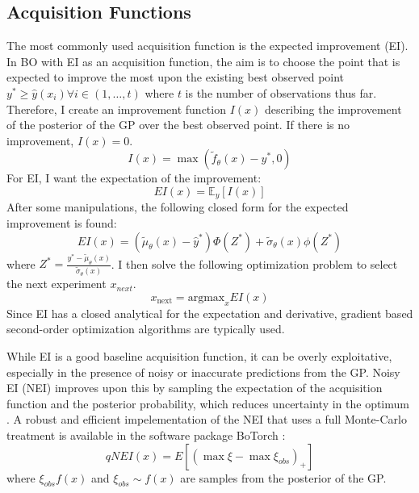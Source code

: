 \subsection{Acquisition Functions}

The most commonly used acquisition function is the expected improvement (EI). In BO with EI as an acquisition function, the aim is to choose the point that is expected to improve the most upon the existing best observed point $y^* \geq \hat y(x_i) \forall i \in (1, \dots, t)$  where  $t$ is the number of observations thus far. Therefore, I create an improvement function $I(x)$ describing the improvement of the posterior of the GP over the best observed point. If there is no improvement, $I(x)=0$.
\begin{equation}
    I(x) = \max(\tilde f_{\theta}(x) -y^*, 0)
\end{equation}
For EI, I want the expectation of the improvement:
\begin{equation}
    EI(x) = \mathbb E_{y}[I(x)]
\end{equation}
After some manipulations, the following closed form for the expected improvement is found:
\begin{equation}
    EI(x) =(\tilde \mu_{\theta}(x)-\hat y^*)\Phi(Z^*) + \tilde \sigma_{\theta}(x) \phi(Z^*)
\end{equation}
where $Z^*= \frac{y^*-\tilde\mu_{\theta}(x)}{\tilde \sigma_{\theta}(x)}$.  I then solve the following optimization problem to select the next experiment $x_{next}$.
\begin{equation}
    x_{\text{next}} = \text{argmax}_{x} EI(x)
\end{equation}
Since EI has a closed analytical for the expectation and derivative, gradient based second-order optimization algorithms are typically used. 

While EI is a good baseline acquisition function, it can be overly exploitative, especially in the presence of noisy or inaccurate predictions from the GP.  Noisy EI (NEI) improves upon this by sampling the expectation of the acquisition function and the posterior probability, which reduces uncertainty in the optimum \cite{Letham2019}. A robust and efficient impelementation of the NEI that uses a full Monte-Carlo treatment is available in the software package BoTorch \cite{Balandat2020}:
\begin{equation}
qNEI(x)= E[(\max \xi  - \max \xi_{obs} )_+]
\end{equation}
where $\xi_{obs} f(x)$ and $\xi_{obs}\sim f(x)$ are samples from the posterior of the GP.

